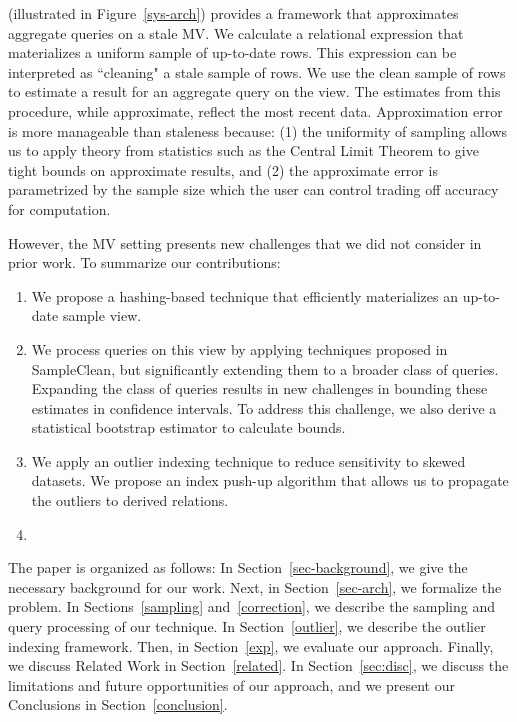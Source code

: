\svcfull (\svc illustrated in Figure~\ref{sys-arch}) provides a framework that approximates aggregate queries on a stale MV.
We calculate a relational expression that materializes a uniform sample of up-to-date rows.
This expression can be interpreted as ``cleaning" a stale sample of rows.
We use the clean sample of rows to estimate a result for an aggregate query on the view.
The estimates from this procedure, while approximate, reflect the most recent data. 
Approximation error is more manageable than staleness because: (1) the uniformity of sampling allows us to apply theory from statistics such as the Central Limit Theorem to give tight bounds on approximate results, and (2) the approximate error is parametrized by the sample size which the user can control trading off accuracy for computation.

However, the MV setting presents new challenges that we did not consider in prior work.
To summarize our contributions:
\begin{enumerate}[noitemsep]
\item We propose a hashing-based technique that efficiently materializes an up-to-date sample view.
\item We process queries on this view by applying techniques proposed in SampleClean, but significantly extending them to a broader class of queries. Expanding the class of queries results in new challenges in bounding these estimates in confidence intervals. To address this challenge, we also derive a statistical bootstrap estimator to calculate bounds.
\item We apply an outlier indexing technique to reduce sensitivity to skewed datasets. %
We propose an index push-up algorithm that allows us to propagate the outliers to derived relations.
\item {}
\end{enumerate} 

The paper is organized as follows: 
In Section~\ref{sec-background}, we give the necessary background for our work.
Next, in Section~\ref{sec-arch}, we formalize the problem.
In Sections~\ref{sampling} and~\ref{correction}, we describe the sampling and query processing of our technique.
In Section~\ref{outlier}, we describe the outlier indexing framework.
Then, in Section~\ref{exp}, we evaluate our approach.
Finally, we discuss Related Work in Section~\ref{related}.
In Section~\ref{sec:disc}, we discuss the limitations and future opportunities of our approach, and we present our Conclusions in Section~\ref{conclusion}.
